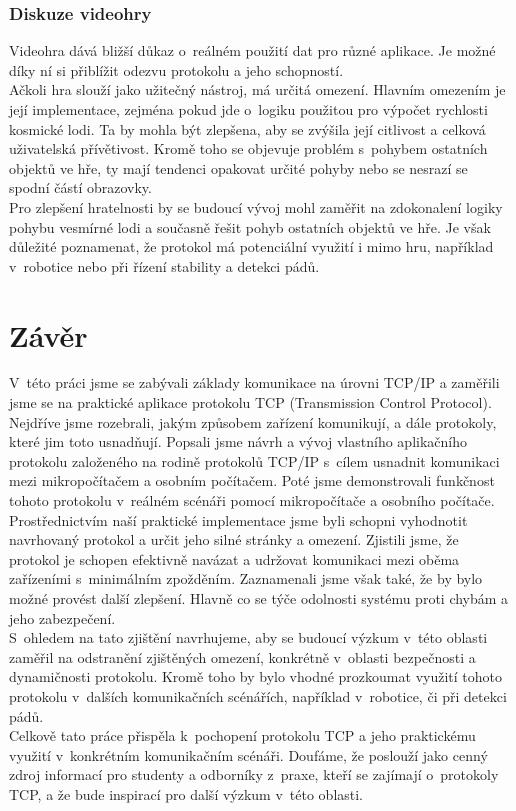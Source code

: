 \documentclass[12pt]{report}			%
\begin{document}
\subsection{Diskuze videohry}

Videohra dává bližší důkaz o~reálném použití dat pro různé aplikace. Je možné díky ní si přiblížit odezvu protokolu a jeho schopností. 
\\
Ačkoli hra slouží jako užitečný nástroj, má určitá omezení. Hlavním omezením je její implementace, zejména pokud jde o~logiku použitou pro výpočet rychlosti kosmické lodi. Ta by mohla být zlepšena, aby se zvýšila její citlivost a celková uživatelská přívětivost. Kromě toho se objevuje problém s~pohybem ostatních objektů ve hře, ty mají tendenci opakovat určité pohyby nebo se nesrazí se spodní částí obrazovky.
\\
Pro zlepšení hratelnosti by se budoucí vývoj mohl zaměřit na zdokonalení logiky pohybu vesmírné lodi a současně řešit pohyb ostatních objektů ve hře. Je však důležité poznamenat, že protokol má potenciální využití i mimo hru, například v~robotice nebo při řízení stability a detekci pádů.



	\chapter*{Závěr}
	
		V~této práci jsme se zabývali základy komunikace na úrovni TCP/IP a zaměřili jsme se na praktické aplikace protokolu TCP (Transmission Control Protocol). Nejdříve jsme rozebrali, jakým způsobem zařízení komunikují, a dále protokoly, které jim toto usnadňují. Popsali jsme návrh a vývoj vlastního aplikačního protokolu založeného na rodině protokolů TCP/IP s~cílem usnadnit komunikaci mezi mikropočítačem a osobním počítačem. Poté jsme demonstrovali funkčnost tohoto protokolu v~reálném scénáři pomocí mikropočítače a osobního počítače.
\\
Prostřednictvím naší praktické implementace jsme byli schopni vyhodnotit navrhovaný protokol a určit jeho silné stránky a omezení. Zjistili jsme, že protokol je schopen efektivně navázat a udržovat komunikaci mezi oběma zařízeními s~minimálním zpožděním. Zaznamenali jsme však také, že by bylo možné provést další zlepšení. Hlavně co se týče odolnosti systému proti chybám a jeho zabezpečení.  
\\
S~ohledem na tato zjištění navrhujeme, aby se budoucí výzkum v~této oblasti zaměřil na odstranění zjištěných omezení, konkrétně v~oblasti bezpečnosti a dynamičnosti protokolu. Kromě toho by bylo vhodné prozkoumat využití tohoto protokolu v~dalších komunikačních scénářích, například v~robotice, či při detekci pádů.
\\
Celkově tato práce přispěla k~pochopení protokolu TCP a jeho praktickému využití v~konkrétním komunikačním scénáři. Doufáme, že poslouží jako cenný zdroj informací pro studenty a odborníky z~praxe, kteří se zajímají o~protokoly TCP, a že bude inspirací pro další výzkum v~této oblasti.
	
\end{document}
